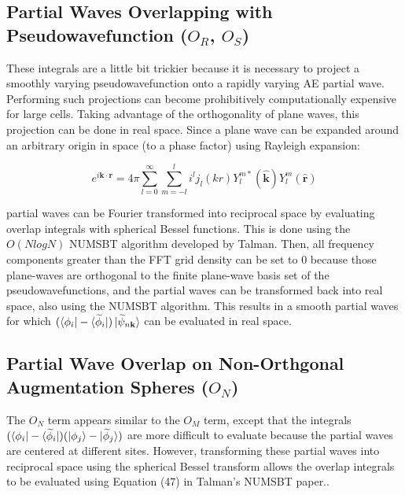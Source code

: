 \documentclass[12pt]{article}
\begin{document}
\subsection{Partial Waves Overlapping with Pseudowavefunction ($O_R$, $O_S$)}

These integrals are a little bit trickier because it is necessary to project
a smoothly varying pseudowavefunction onto a rapidly varying AE partial wave.
Performing such projections can become prohibitively computationally expensive
for large cells.
Taking advantage of the orthogonality of plane waves, this projection can be
done in real space. Since a plane wave can be expanded around an arbitrary origin
in space (to a phase factor) using Rayleigh expansion:

\begin{equation}
e^{i\mathbf{k} \cdot \mathbf{r}} = 4\pi \sum_{l=0}^{\infty}\sum_{m=-l}^{l}
i^l j_l(kr)Y_l^{m*}(\mathbf{\hat{k}})Y_l^m(\mathbf{\hat{r}})
\label{eq:pwexp}
\end{equation}

partial waves can be Fourier transformed into reciprocal space by evaluating
overlap integrals with spherical Bessel functions. This is done using the
$O(NlogN)$ NUMSBT algorithm developed by Talman.\cite{TALMAN} Then, all
frequency components greater than the FFT grid density can be set to 0
because those plane-waves are orthogonal to the finite plane-wave
basis set of the pseudowavefunctions,
and the partial waves can be transformed back into real space, also using
the NUMSBT algorithm. This results in a smooth partial waves
for which $(\bra{\phi_i}-\bra{\widetilde{\phi}_i})\ket{\widetilde{\psi}_{n\mathbf{k}}}$
can be evaluated in real space.

\subsection{Partial Wave Overlap on Non-Orthgonal Augmentation Spheres ($O_N$)}

The $O_N$ term appears similar to the $O_M$ term, except that the integrals
$(\bra{\phi_i}-\bra{\widetilde{\phi}_i})(\ket{\phi_j}-\ket{\widetilde{\phi}_j})$
are more difficult to evaluate because the partial waves are centered
at different sites. However, transforming these partial waves into
reciprocal space using the spherical Bessel transform allows the
overlap integrals to be evaluated using Equation (47) in Talman's
NUMSBT paper.\cite{TALMAN}.

\printbibliography
\end{document}

